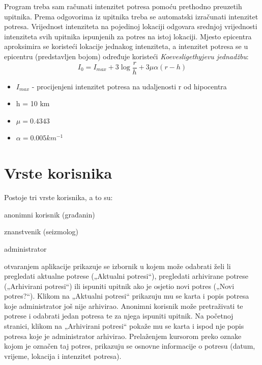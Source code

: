 	Program treba sam računati intenzitet potresa pomoću prethodno preuzetih upitnika. Prema odgovorima iz upitnika treba se automatski izračunati intenzitet potresa. 
	Vrijednost intenziteta na pojedinoj lokaciji odgovara srednjoj vrijednosti intenziteta svih upitnika ispunjenih za potres na istoj lokaciji. Mjesto epicentra aproksimira se koristeći lokacije jednakog intenziteta, a intenzitet potresa se u epicentru (predstavljen bojom) određuje koristeći \textit{Koevesligethyjevu jednadžbu}:
\begin{equation}
  I_{0} = I_{max} + 3\log\frac{r}{h} + 3\mu\alpha(r-h)
\end{equation}

\begin{itemize}                                                             
    \item $I_{max}$ - procijenjeni intenzitet potresa na udaljenosti r od hipocentra
    \item h = 10 km 
    \item $\mu=0.4343$
    \item $\alpha=0.005 km^{-1}$
    
\end{itemize} 


\section{Vrste korisnika}
Postoje tri vrste korisnika, a to su:
\begin{packed_item}
	\item anonimni korisnik (građanin)
	\item znanstvenik (seizmolog)
	\item administrator
\end{packed_item}

 otvaranjem aplikacije prikazuje se izbornik u kojem može odabrati želi li pregledati aktualne potrese („Aktualni potresi“), pregledati arhivirane potrese („Arhivirani potresi“) ili ispuniti upitnik ako je osjetio novi potres („Novi potres?“). Klikom na „Aktualni potresi“ prikazuju mu se karta i popis potresa koje administrator još nije arhivirao. Anonimni korisnik može pretraživati te potrese i odabrati jedan potresa te za njega ispuniti upitnik. Na početnoj stranici, klikom na „Arhivirani potresi“ pokaže mu se karta i ispod nje popis potresa koje je administrator arhivirao. Prelaženjem kursorom preko oznake kojom je označen taj potres, prikazuju se osnovne informacije o potresu (datum, vrijeme, lokacija i intenzitet potresa).

